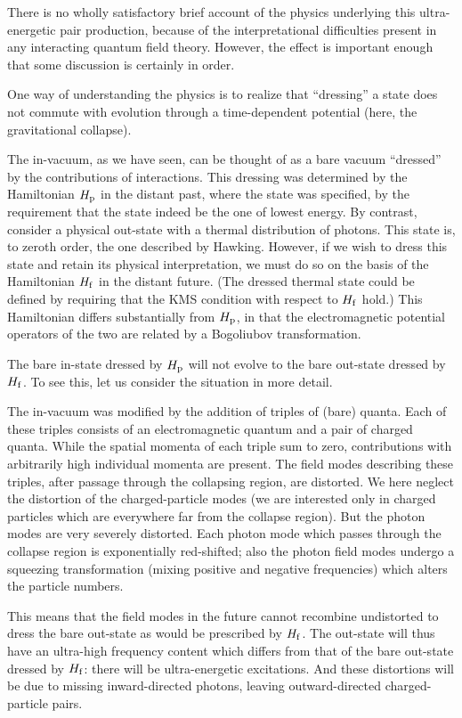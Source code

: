 \documentclass[12pt]{article}
\begin{document}
There is no wholly satisfactory brief account of the physics
underlying this ultra-energetic pair production, because of the interpretational
difficulties present in any interacting quantum field theory.  However, the
effect is important enough that some discussion is certainly in order.

One way of understanding the physics is to realize that ``dressing'' a state
does not commute with evolution through a time-dependent potential (here, the
gravitational collapse).

The in-vacuum, as we have seen, can be thought of as a bare vacuum ``dressed''
by the contributions of interactions.  
This dressing was determined by the Hamiltonian $H_{\rm p}$
in the distant past, where the
state was specified, by the requirement that the state indeed be 
the one of lowest energy. 
By contrast, consider a physical out-state with a thermal distribution of
photons.  This state is, to zeroth order, the one described by Hawking. 
However, if we wish to dress this state and retain its physical interpretation,
we must do so on the basis of the Hamiltonian $H_{\rm f}$ in the distant future.
(The dressed thermal state could be defined by requiring that the KMS
condition with respect to $H_{\rm f}$ hold.)
This Hamiltonian differs substantially from $H_{\rm p}$, in that the
electromagnetic potential operators of the two are related by a Bogoliubov
transformation.

The bare in-state dressed by $H_{\rm p}$ will not evolve to the bare out-state
dressed by $H_{\rm f}$. To see this, let us consider the situation in more
detail.

The in-vacuum was modified by the addition of 
triples of (bare) quanta.  Each of these triples
consists of an electromagnetic quantum and a pair of charged quanta.  While the
spatial momenta of each triple sum to zero, contributions with arbitrarily high
individual momenta are present.
The field modes describing these triples, after passage through the collapsing
region, are distorted.  We here neglect the distortion of the charged-particle
modes (we are interested only in charged particles which are everywhere far
from the collapse region).  But the photon modes are very severely
distorted.  Each photon mode which passes through the collapse
region is exponentially red-shifted; also the photon field modes undergo a
squeezing transformation (mixing positive and negative frequencies) which alters
the particle numbers.  

This means that the field modes in the future cannot recombine undistorted to
dress the bare out-state as would be prescribed by $H_{\rm f}$.  The out-state
will thus have an ultra-high frequency content which differs from that 
of the bare out-state
dressed by $H_{\rm f}$:  there will be ultra-energetic excitations.
And these distortions will be due to missing inward-directed photons,
leaving outward-directed charged-particle pairs.
\end{document}
